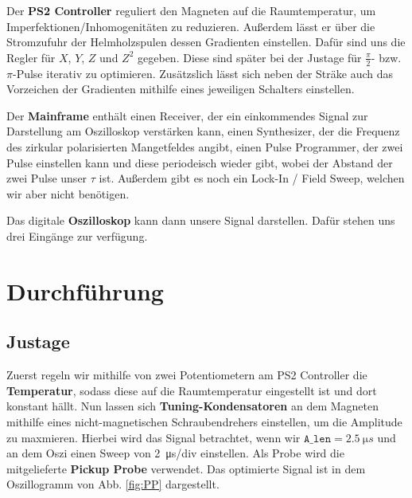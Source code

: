 \documentclass[10pt]{article}
\begin{document}
\begin{multicols}{2}
  Der \textbf{PS2 Controller} reguliert den Magneten auf die Raumtemperatur, um Imperfektionen/Inhomogenitäten zu reduzieren. Außerdem lässt er über die Stromzufuhr der Helmholzspulen dessen Gradienten einstellen. Dafür sind uns die Regler für $X$, $Y$, $Z$ und $Z^2$ gegeben. Diese sind später bei der Justage für $\frac{\pi}{2}$- bzw. $\pi$-Pulse iterativ zu optimieren. Zusätzslich lässt sich neben der Sträke auch das Vorzeichen der Gradienten mithilfe eines jeweiligen Schalters einstellen.

  Der \textbf{Mainframe} enthält einen Receiver, der ein einkommendes Signal zur Darstellung am Oszilloskop verstärken kann, einen Synthesizer, der die Frequenz des zirkular polarisierten Mangetfeldes angibt, einen Pulse Programmer, der zwei Pulse einstellen kann und diese periodeisch wieder gibt, wobei der Abstand der zwei Pulse unser $\tau$ ist. Außerdem gibt es noch ein Lock-In / Field Sweep, welchen wir aber nicht benötigen.

  Das digitale \textbf{Oszilloskop} kann dann unsere Signal darstellen. Dafür stehen uns drei Eingänge zur verfügung. 

  \section{Durchführung}
  \subsection{Justage}
  Zuerst regeln wir mithilfe von zwei Potentiometern am PS2 Controller die \textbf{Temperatur}, sodass diese auf die Raumtemperatur eingestellt ist und dort konstant hällt. Nun lassen sich \textbf{Tuning-Kondensatoren} an dem Magneten mithilfe eines nicht-magnetischen Schraubendrehers einstellen, um die Amplitude zu maxmieren. Hierbei wird das Signal betrachtet, wenn wir $\texttt{A_len}=\SI{2.5}{\micro s}$ und an dem Oszi einen Sweep von \SI{2}{\micro s/div} einstellen. Als Probe wird die mitgelieferte \textbf{Pickup Probe} verwendet. Das optimierte Signal ist in dem Oszillogramm von Abb. \ref{fig:PP} dargestellt.


\end{multicols}
\end{document}

